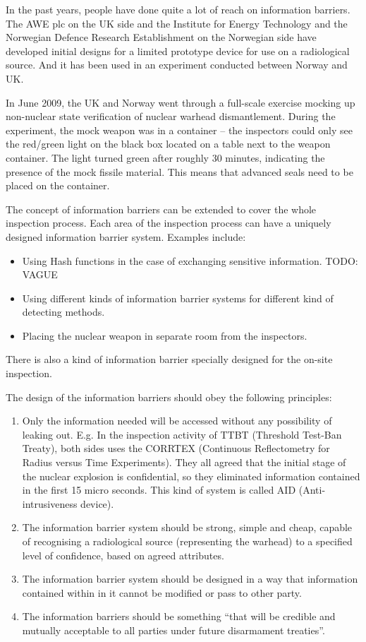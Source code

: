 \documentclass[twoside,titlepage,11pt,twocolumn,a4paper]{article}
\begin{document}
In the past years, people have done quite a lot of reach on
information barriers. The AWE plc on the UK side and the Institute for
Energy Technology and the Norwegian Defence Research Establishment on
the Norwegian side have developed initial designs for a limited
prototype device for use on a radiological source. And it has been
used in an experiment conducted between Norway and UK.

In June 2009, the UK and Norway went through a full-scale exercise
mocking up non-nuclear state verification of nuclear warhead
dismantlement.  During the experiment, the mock weapon was in a
container -- the inspectors could only see the red/green light on the
black box located on a table next to the weapon container. The light
turned green after roughly 30 minutes, indicating the presence of the
mock fissile material. This means that advanced seals need to be
placed on the container.

The concept of information barriers can be extended to cover the whole
inspection process. Each area of the inspection process can have a
uniquely designed information barrier system. Examples include:
\begin{itemize}
  \item Using Hash functions in the case of exchanging sensitive
    information. \citep{knuth1976} TODO: VAGUE
  \item Using different kinds of information barrier systems for
    different kind of detecting methods.
  \item Placing the nuclear weapon in separate room from the
    inspectors.
\end{itemize}
There is also a kind of information barrier specially
designed for the on-site inspection.

The design of the information barriers should obey the following
principles:
\begin{enumerate}
  \item Only the information needed will be accessed without any
    possibility of leaking out. E.g. In the inspection activity of
    TTBT (Threshold Test-Ban Treaty), both sides uses the CORRTEX
    (Continuous Reflectometry for Radius versus Time
    Experiments). \citep{deupree1981} They all agreed that the initial
    stage of the nuclear explosion is confidential, so they eliminated
    information contained in the first 15 micro seconds. This kind of
    system is called AID (Anti-intrusiveness device).
  \item The information barrier system should be strong, simple and
    cheap, capable of recognising a radiological source (representing
    the warhead) to a specified level of confidence, based on agreed
    attributes.
  \item The information barrier system should be designed in a way
    that information contained within in it cannot be modified or pass
    to other party.
  \item The information barriers should be something ``that will be
    credible and mutually acceptable to all parties under future
    disarmament treaties''. \citep{shultz2007}
\end{enumerate}
\end{document}

